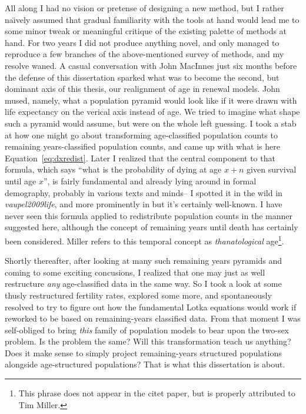 All along I had no vision or pretense of designing a new method, but I rather
na\"{\i}vely assumed that gradual familiarity with the tools at hand would lead
me to some minor tweak or meaningful critique of the existing palette of methods at
hand. For two years I did not produce anything novel, and only managed to
reproduce a few branches of the above-mentioned survey of methods, and my
resolve waned. A casual conversation with John MacInnes just six months before
the defense of this dissertation sparked what was to become the second, but
dominant axis of this thesis, our realignment of age in renewal models. John
mused, namely, what a population pyramid would look like if it were drawn with
life expectancy on the verical axis instead of age. We tried to imagine what
shape such a pyramid would assume, but were on the whole left guessing. I took a
stab at how one might go about transforming age-classified population counts to
remaining years-classified population counts, and came up with what is here
Equation~\ref{eq:dxredist}. Later I realized that the central component to that
formula, which says ``what is the probability of dying at age $x+n$ given
survival until age $x$'', is fairly fundamental and already lying around in
formal demography, probably in various texts and minds-- I spotted it in the
wild in \textit{vaupel2009life}, and more prominently in
\citet{miller2001increasing} but it's certainly well-known. I have never seen 
this formula applied to redistribute population counts in the manner
suggested here, although the concept of remaining years until death has
certainly been considered. Miller refers to this
temporal concept as \textit{thanatological} age\footnote{This phrase does not
appear in the citet paper, but is properly attributed to Tim Miller.}.

Shortly thereafter, after looking at many such remaining years pyramids and
coming to some exciting concusions, I realized that one may just as well
restructure \textit{any} age-classified data in the same way. So I took a 
look at some thusly restructured fertility rates, explored
some more, and spontaneously resolved to try to figure out how the fundamental
Lotka equations would work if reworked to be based on remaining-years classified
data. From that moment I was self-obliged to bring \textit{this} family of
population models to bear upon the two-sex problem. Is the problem the same?
Will this transformation teach us anything? Does it make sense to simply
project remaining-years structured populations alongside age-structured
populations? That is what this dissertation is about.

